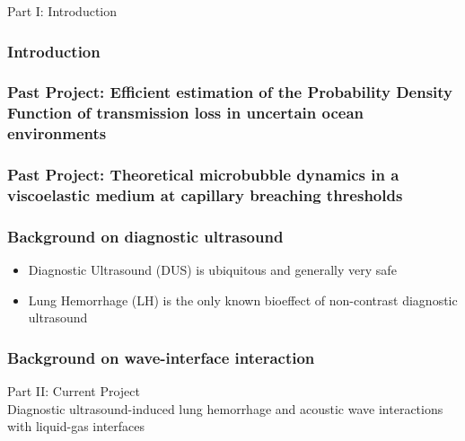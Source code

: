 
\embedfile{\jobname}
%

\newcommand{\orderof}[1]{\ensuremath{\mathcal{O}\left(#1\right)}}






\begin{frame}
  \centering
  \begin{center}
    \LARGE Part I: Introduction
  \end{center}
\end{frame}
\begin{frame} \frametitle{Introduction}

\end{frame}
\begin{frame} \frametitle{Past Project: Efficient estimation of the Probability Density Function of transmission loss in uncertain ocean environments}

\end{frame}
\begin{frame} \frametitle{Past Project: Theoretical microbubble dynamics in a viscoelastic medium at capillary breaching thresholds}

\end{frame}
\begin{frame} \frametitle{Background on diagnostic ultrasound}
  \begin{itemize}
    \item Diagnostic Ultrasound (DUS) is ubiquitous and generally very safe
    \item Lung Hemorrhage (LH) is the only known bioeffect of non-contrast diagnostic ultrasound
  \end{itemize}
\end{frame}
\begin{frame} \frametitle{Background on wave-interface interaction}

\end{frame}
\begin{frame}
  \centering
  \begin{center}
    {\LARGE Part II: Current Project}\\
    Diagnostic ultrasound-induced lung hemorrhage and acoustic wave
    interactions with liquid-gas interfaces
  \end{center}
\end{frame}
